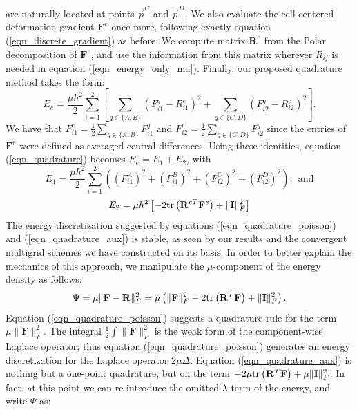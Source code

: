 are naturally located at points $\vec{p}^C$ and $\vec{p}^D$. We also evaluate the cell-centered deformation gradient $\mathbf{F}^e$ once more, following exactly equation
(\ref{eqn_discrete_gradient}) as before. We compute matrix $\mathbf{R}^e$ from the Polar decomposition of $\mathbf{F}^e$, and use the information from this matrix wherever $R_{ij}$ is needed 
in equation (\ref{eqn_energy_only_mu}). Finally, our proposed quadrature method takes the form:
\begin{equation}
\!E_e=\frac{\mu h^2}{2}\sum_{i=1}^2\left[\sum_{q\in\{A,B\}}\!\!\!\!\left(F_{i1}^q\!-\!R_{i1}^e\right)^2+\!\!\!\!\sum_{q\in\{C,D\}}\!\!\!\!\left(F_{i2}^q\!-\!R_{i2}^e\right)^2\right].
\label{eqn_quadrature}
\end{equation}
We have that $F_{i1}^e\!=\!\frac{1}{2}\sum_{q\in\{A,B\}}F_{i1}^q$ and $F_{i2}^e\!=\!\frac{1}{2}\sum_{q\in\{C,D\}}F_{i2}^q$ since the entries of $\mathbf{F}^e$ were defined as averaged
central differences. Using these identities, equation (\ref{eqn_quadrature}) becomes $E_e=E_1+E_2$, with
\begin{equation}
E_1=\frac{\mu h^2}{2}\sum_{i=1}^2\left((F_{i1}^A)^2\!+\!(F_{i1}^B)^2\!+\!(F_{i2}^C)^2\!+\!(F_{i2}^D)^2\right),\ \ \mbox{and}
\label{eqn_quadrature_poisson}
\end{equation}
\begin{equation}
E_2=\mu h^2\left[-2\mbox{tr}\left(\mathbf{R}^{eT}\mathbf{F}^e\right)+\|\mathbf{I}\|_F^2\right]
\label{eqn_quadrature_aux}
\end{equation}
The energy discretization suggested by equations (\ref{eqn_quadrature_poisson}) and (\ref{eqn_quadrature_aux}) is stable, as seen by our results and the convergent multigrid schemes
we have constructed on its basis. In order to better explain the
mechanics of this approach, we manipulate the $\mu$-component of the
energy density as follows:
$$
\Psi=\mu\|\mathbf{F}-\mathbf{R}\|_F^2=\mu\left(\|\mathbf{F}\|_F^2-2\mbox{tr}\left(\mathbf{R}^T\mathbf{F}\right)+\|\mathbf{I}\|_F^2\right).
$$
Equation (\ref{eqn_quadrature_poisson}) suggests a quadrature rule for the term $\mu\|\mathbf{F}\|_F^2$. The integral $\frac{1}{2}\int\|\mathbf{F}\|_F^2$ is the weak form of the
component-wise Laplace operator; thus equation (\ref{eqn_quadrature_poisson}) generates an energy discretization for the Laplace operator $2\mu\Delta$. Equation
(\ref{eqn_quadrature_aux}) is nothing but a one-point quadrature, but on the term $-2\mu\mbox{tr}\left(\mathbf{R}^T\mathbf{F}\right)+\mu\|\mathbf{I}\|_F^2$. In fact, at this point we can
re-introduce the omitted $\lambda$-term of the energy, and write $\Psi$ as:
